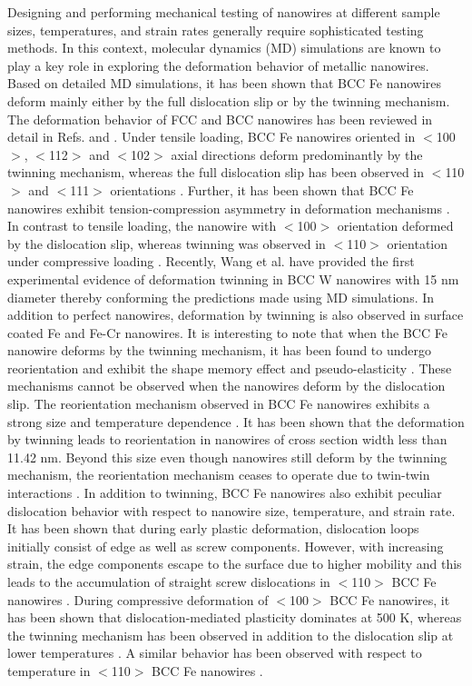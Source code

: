 \documentclass[%
reprint,%
 amssymb, amsmath,%
 aip,apl,%
]{revtex4-1}
\begin{document}
Designing and performing mechanical testing of nanowires at different sample sizes, temperatures, and strain rates generally 
require sophisticated testing methods. In this context, molecular dynamics (MD) simulations are known to play a key role in 
exploring the deformation behavior of metallic nanowires. Based on detailed MD simulations, it has been shown that BCC Fe 
nanowires deform mainly either by the full dislocation slip or by the twinning mechanism. The deformation behavior of FCC and 
BCC nanowires has been reviewed in detail in Refs. \cite{Cai-Review} and \cite{Weinberger-Review}. Under tensile loading, BCC 
Fe nanowires oriented in $<$100$>$, $<$112$>$ and $<$102$>$ axial directions deform predominantly by the twinning mechanism, 
whereas the full dislocation slip has been observed in $<$110$>$ and $<$111$>$ orientations \cite{Sai-CMS16}. Further, it has
been shown that BCC Fe nanowires exhibit tension-compression asymmetry in deformation mechanisms \cite{Sai-CMS16,Healy15}. In
contrast to tensile loading, the nanowire with $<$100$>$ orientation deformed by the dislocation slip, whereas twinning was
observed in $<$110$>$ orientation under compressive loading \cite{Sai-CMS16,Healy15,Thaulow}. Recently, Wang et al. \cite{Wang-Nature} 
have provided the first experimental evidence of deformation twinning in BCC W nanowires with 15 nm diameter thereby conforming 
the predictions made using MD simulations. In addition to perfect nanowires, deformation by twinning is also observed in surface 
coated Fe \cite{Oxidation} and Fe-Cr \cite{Alloy-NWs} nanowires. It is interesting to note that when the BCC Fe nanowire deforms 
by the twinning mechanism, it has been found to undergo reorientation \cite{Sai-CMS15,Reorientation} and exhibit the shape memory 
effect and pseudo-elasticity \cite{Reorientation,Cao,Li-PRB,Interface}. These mechanisms cannot be observed when the nanowires 
deform by the dislocation slip. The reorientation mechanism observed in BCC Fe nanowires exhibits a strong size and temperature 
dependence \cite{Sai-CMS15,Cao}. It has been shown that the deformation by twinning leads to reorientation in nanowires of cross 
section width less than 11.42 nm. Beyond this size even though nanowires still deform by the twinning mechanism, the reorientation 
mechanism ceases to operate due to twin-twin interactions \cite{Sai-CMS15}. In addition to twinning, BCC Fe nanowires also exhibit 
peculiar dislocation behavior with respect to nanowire size, temperature, and strain rate. It has been shown that during early 
plastic deformation, dislocation loops initially consist of edge as well as screw components. However, with increasing strain, 
the edge components escape to the surface due to higher mobility and this leads to the accumulation of straight screw dislocations 
in $<$110$>$ BCC Fe nanowires \cite{Sai-MSEA15}. During compressive deformation of $<$100$>$ BCC Fe nanowires, it has been shown 
that dislocation-mediated plasticity dominates at 500 K, whereas the twinning mechanism has been observed in addition to the 
dislocation slip at lower temperatures \cite{ADutta}. A similar behavior has been observed with respect to temperature in $<$110$>$ 
BCC Fe nanowires \cite{Thaulow}.
\end{document}
